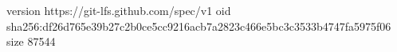version https://git-lfs.github.com/spec/v1
oid sha256:df26d765e39b27c2b0ce5cc9216acb7a2823c466e5bc3c3533b4747fa5975f06
size 87544
